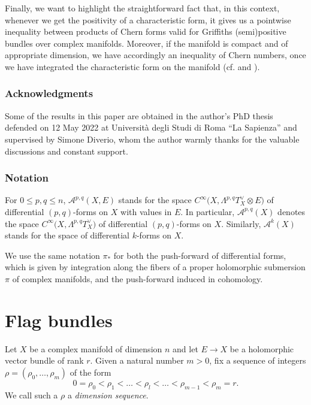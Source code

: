 \documentclass[a4paper]{amsart}
\theoremstyle{plain}%
\theoremstyle{definition}
\theoremstyle{remark}
\begin{document}
	Finally, we want to highlight the straightforward fact that, in this context, whenever we get the positivity of a characteristic form, it gives us a pointwise inequality between products of Chern forms valid for Griffiths (semi)positive bundles over complex manifolds.
	Moreover, if the manifold is compact and of appropriate dimension, we have accordingly an inequality of Chern numbers, once we have integrated the characteristic form on the manifold (cf. \cite[Theorem~{3.2}]{Li20} and \cite[Corollary~{2.5}]{Fag20}).
	
\subsubsection*{Acknowledgments}
	Some of the results in this paper are obtained in the author's PhD thesis \cite{Fag22} defended on 12 May 2022 at Università degli Studi di Roma ``La Sapienza'' and supervised by Simone Diverio, whom the author warmly thanks for the valuable discussions and constant support.

\subsubsection*{Notation}
	For $ 0 \le p,q \le n $, $ \mathcal{A}^{p,q}(X,E) $ stands for the space $ C^{\infty}\bigl(X,\Lambda^{p,q}T_X^{\vee}\otimes E\bigr) $ of differential $ (p,q) $-forms on $ X $ with values in $ E $.
	In particular, $ \mathcal{A}^{p,q}(X) $ denotes the space $ C^{\infty}\bigl(X,\Lambda^{p,q}T_X^{\vee}\bigr) $ of differential $ (p,q) $-forms on $ X $.
	Similarly, $ \mathcal{A}^{k}(X) $ stands for the space of differential $ k $-forms on $ X $.
	
	We use the same notation $ \pi_{*} $ for both the {push-forward} of differential forms, which is given by integration along the fibers of a proper holomorphic submersion $ \pi $ of complex manifolds, and the {push-forward} induced in cohomology.


\section{Flag bundles}\label{sect: flag bundles introduction}
Let $ X $ be a complex manifold of dimension $ n $ and let $ E \to X $ be a holomorphic vector bundle of rank $ r $.
Given a natural number $ m > 0 $, fix a sequence of integers $ \rho=(\rho_0,\dots,\rho_m) $ of the form
\begin{equation*}
	0 = \rho_0 < \rho_1 < \dots < \rho_l < \dots < \rho_{m-1} < \rho_m = r .
\end{equation*}
We call such a $ \rho $ a \emph{dimension sequence}.
\end{document}
